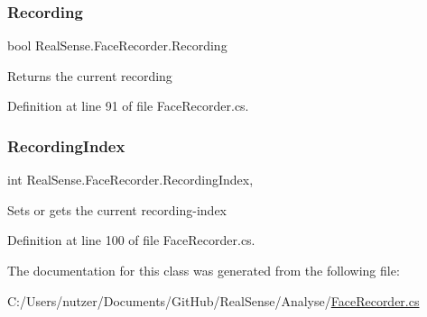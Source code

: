 \subsubsection{\texorpdfstring{Recording}{Recording}}
{\footnotesize\ttfamily bool Real\+Sense.\+Face\+Recorder.\+Recording\hspace{0.3cm}{\ttfamily [get]}}

Returns the current recording 

Definition at line 91 of file Face\+Recorder.\+cs.

\mbox{\label{class_real_sense_1_1_face_recorder_a4f1a094d0321d299feb5aa0e3553b506}} 
\subsubsection{\texorpdfstring{Recording\+Index}{RecordingIndex}}
{\footnotesize\ttfamily int Real\+Sense.\+Face\+Recorder.\+Recording\+Index\hspace{0.3cm}{\ttfamily [get]}, {\ttfamily [set]}}

Sets or gets the current recording-\/index 

Definition at line 100 of file Face\+Recorder.\+cs.



The documentation for this class was generated from the following file\+:\begin{DoxyCompactItemize}
\item 
C\+:/\+Users/nutzer/\+Documents/\+Git\+Hub/\+Real\+Sense/\+Analyse/\hyperlink{_face_recorder_8cs}{Face\+Recorder.\+cs}\end{DoxyCompactItemize}
